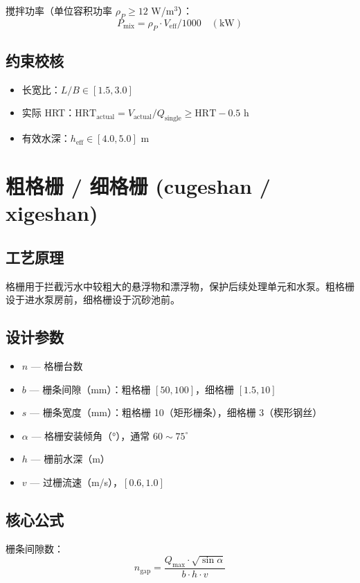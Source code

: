 \documentclass[12pt,a4paper]{ctexart}
\begin{document}
搅拌功率（单位容积功率 $\rho_P \ge 12$ W/m$^3$）：
\begin{equation}
P_{\text{mix}} = \rho_P \cdot V_{\text{eff}} / 1000 \quad (\text{kW})
\end{equation}

\subsection{约束校核}
\begin{itemize}
  \item 长宽比：$L/B \in [1.5, 3.0]$
  \item 实际 HRT：$\text{HRT}_{\text{actual}} = V_{\text{actual}} / Q_{\text{single}} \ge \text{HRT} - 0.5$ h
  \item 有效水深：$h_{\text{eff}} \in [4.0, 5.0]$ m
\end{itemize}

\section{粗格栅 / 细格栅 (cugeshan / xigeshan)}

\subsection{工艺原理}
格栅用于拦截污水中较粗大的悬浮物和漂浮物，保护后续处理单元和水泵。粗格栅设于进水泵房前，细格栅设于沉砂池前。

\subsection{设计参数}
\begin{itemize}
  \item $n$ — 格栅台数
  \item $b$ — 栅条间隙（mm）：粗格栅 $[50, 100]$，细格栅 $[1.5, 10]$
  \item $s$ — 栅条宽度（mm）：粗格栅 10（矩形栅条），细格栅 3（楔形钢丝）
  \item $\alpha$ — 格栅安装倾角（°），通常 $60\sim75^\circ$
  \item $h$ — 栅前水深（m）
  \item $v$ — 过栅流速（m/s），$[0.6, 1.0]$
\end{itemize}

\subsection{核心公式}
栅条间隙数：
\begin{equation}
n_{\text{gap}} = \frac{Q_{\text{max}} \cdot \sqrt{\sin \alpha}}{b \cdot h \cdot v}
\end{equation}
\end{document}
